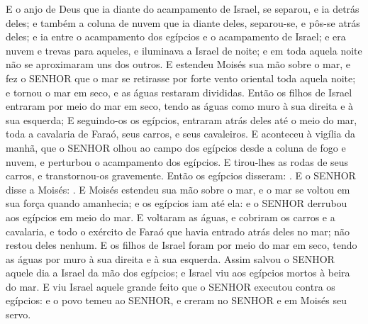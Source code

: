 {  E o anjo de Deus que ia diante do acampamento de Israel, se separou, e ia detrás deles; e também a coluna de nuvem que ia diante deles, separou-se, e pôs-se atrás deles;
  e ia entre o acampamento dos egípcios e o acampamento de Israel; e era nuvem e trevas para aqueles, e iluminava a Israel de noite; e em toda aquela noite não se aproximaram uns dos outros.
  E estendeu Moisés sua mão sobre o mar, e fez o SENHOR que o mar se retirasse por forte vento oriental toda aquela noite; e tornou o mar em seco, e as águas restaram divididas.
  Então os filhos de Israel entraram por meio do mar em seco, tendo as águas como muro à sua direita e à sua esquerda;
  E seguindo-os os egípcios, entraram atrás deles até o meio do mar, toda a cavalaria de Faraó, seus carros, e seus cavaleiros.
  E aconteceu à vigília da manhã, que o SENHOR olhou ao campo dos egípcios desde a coluna de fogo e nuvem, e perturbou o acampamento dos egípcios.
  E tirou-lhes as rodas de seus carros, e transtornou-os gravemente. Então os egípcios disseram: .
  E o SENHOR disse a Moisés: .
  E Moisés estendeu sua mão sobre o mar, e o mar se voltou em sua força quando amanhecia; e os egípcios iam até ela: e o SENHOR derrubou aos egípcios em meio do mar.
  E voltaram as águas, e cobriram os carros e a cavalaria, e todo o exército de Faraó que havia entrado atrás deles no mar; não restou deles nenhum. %
  E os filhos de Israel foram por meio do mar em seco, tendo as águas por muro à sua direita e à sua esquerda.
  Assim salvou o SENHOR aquele dia a Israel da mão dos egípcios; e Israel viu aos egípcios mortos à beira do mar.
  E viu Israel aquele grande feito que o SENHOR executou contra os egípcios: e o povo temeu ao SENHOR, e creram no SENHOR e em Moisés seu servo.
\par }

